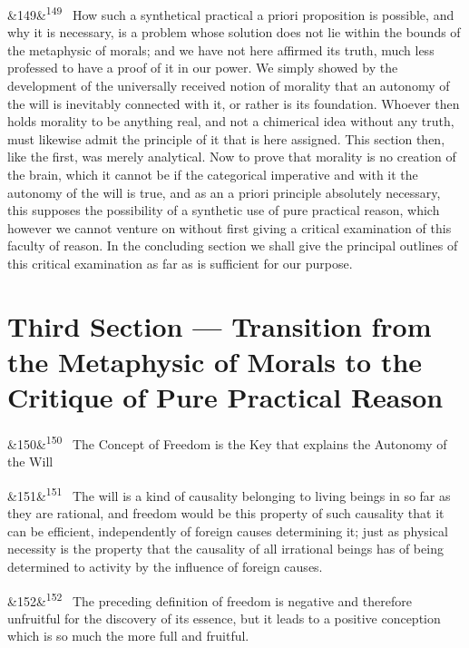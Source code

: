 \documentclass[12pt]{article}
\newcommand{\para}[1][]{\par\noindent\ifx&#1&\else\textsuperscript{\footnotesize #1}~\fi}
\begin{document}
\para[149] How such a synthetical practical a priori proposition is possible, and why it is necessary, is a problem whose solution does not lie within the bounds of the metaphysic of morals; and we have not here affirmed its truth, much less professed to have a proof of it in our power. We simply showed by the development of the universally received notion of morality that an autonomy of the will is inevitably connected with it, or rather is its foundation. Whoever then holds morality to be anything real, and not a chimerical idea without any truth, must likewise admit the principle of it that is here assigned. This section then, like the first, was merely analytical. Now to prove that morality is no creation of the brain, which it cannot be if the categorical imperative and with it the autonomy of the will is true, and as an a priori principle absolutely necessary, this supposes the possibility of a synthetic use of pure practical reason, which however we cannot venture on without first giving a critical examination of this faculty of reason. In the concluding section we shall give the principal outlines of this critical examination as far as is sufficient for our purpose.

\section*{Third Section --- Transition from the Metaphysic of Morals to the Critique of Pure Practical Reason}

\para[150] The Concept of Freedom is the Key that explains the Autonomy of the Will

\para[151] The will is a kind of causality belonging to living beings in so far as they are rational, and freedom would be this property of such causality that it can be efficient, independently of foreign causes determining it; just as physical necessity is the property that the causality of all irrational beings has of being determined to activity by the influence of foreign causes.

\para[152] The preceding definition of freedom is negative and therefore unfruitful for the discovery of its essence, but it leads to a positive conception which is so much the more full and fruitful.
\end{document}
